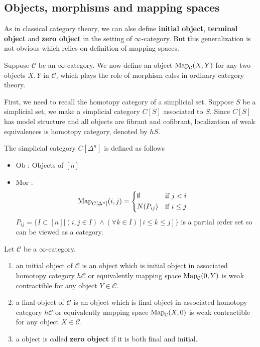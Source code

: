 \subsection{Objects, morphisms and mapping spaces}
As in classical category theory, we can alse define \textbf{initial object}, \textbf{terminal object} and \textbf{zero object} in the setting of $\infty$-category. But this generalization is not obvious which relies on definition of mapping spaces.
\par
Suppose $\mathcal{C}$ be an $\infty$-category. We now define an object $\text{Map}_{\mathcal{C}}(X,Y)$ for any two objects $X,Y$ in $\mathcal{C}$, which plays the role of morphism calss in ordinary category theory.
\par
First, we need to recall the homotopy category of a simplicial set. Suppose $S$ be a simplicial set, we make a simplicial category $C[S]$ associated to $S$. Since $C[S]$ has model structure and all objects are fibrant and cofibrant, localization of weak equivalences is homotopy category, denoted by $hS$.
\par
The simplicial category $C[\Delta^{n}]$ is defined as follows
\begin{itemize}
  \item Ob : Objects of $[n]$
  \item Mor : \[
  \text{Map}_{C[\Delta^n]}(i,j)= \left\{
  \begin{aligned}
    &\emptyset & &\text{if } j<i\\
    &N(P_{ij})& &\text{if } i \leq j&
  \end{aligned} \right.
  \]
  $P_{ij}=\{ I \subset [n] \big| (i,j \in I) \wedge (\forall k \in I )[i \leq k \leq j] \} $ is a partial order set so can be viewed as a category.
\end{itemize}
\begin{mydefn}
Let $\mathcal{C}$ be a $\infty$-category.
\begin{enumerate}
  \item an initial object of $\mathcal{C}$ is an object which is initial object in associated homotopy category $h \mathcal{C}$ or equivalently mapping space $\text{Map}_{\mathcal{C}}(0,Y)$ is weak contractible for any object $Y \in \mathcal{C}$.
  \item a final object of $\mathcal{C}$ is an object which is final object in associated homotopy category $h \mathcal{C}$ or equivalently mapping space $\text{Map}_{\mathcal{C}}(X,0)$ is weak contractible for any object $X \in \mathcal{C}$.
  \item a object is called \textbf{zero object} if it is both final and initial.
\end{enumerate}
\end{mydefn}


